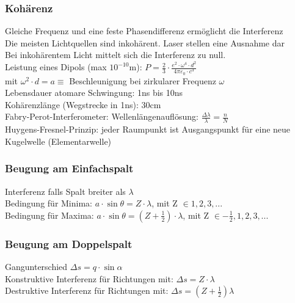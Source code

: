 \documentclass[fs, footer]{latex4ei}
\begin{document}
\begin{multicols*}{4}
\subsubsection{Kohärenz}
Gleiche Frequenz und eine feste Phasendifferenz ermöglicht die Interferenz\\
Die meisten Lichtquellen sind inkohärent. Laser stellen eine Ausnahme dar\\
Bei inkohärentem Licht mittelt sich die Interferenz zu null.\\

Leistung eines Dipols (max $10^{-10}$m): $P = \frac{2}{3}\cdot\frac{e^2\cdot\omega^4\cdot d^2}{4\pi\varepsilon_0\cdot c^3}$\\
 mit $\omega^2\cdot d = a \equiv$ Beschleunigung bei zirkularer Frequenz $\omega$\\ 
Lebensdauer atomare Schwingung: 1ns bis 10ns\\
Kohärenzlänge (Wegstrecke in 1ns): 30cm\\
Fabry-Perot-Interferometer: Wellenlängenauflösung: $\frac{\Delta \lambda}{\lambda} = \frac{n}{N}$\\

Huygens-Fresnel-Prinzip: jeder Raumpunkt ist Ausgangspunkt für eine neue Kugelwelle (Elementarwelle)\\
\subsubsection{Beugung am Einfachspalt}
Interferenz falls Spalt breiter als $\lambda$\\
Bedingung für Minima: $a\!\cdot\!\sin\theta = Z\cdot\lambda$, mit Z $\in 1,2,3,...$\\ %
Bedingung für Maxima: $a\cdot\sin\theta = (Z+\frac{1}{2})\cdot\lambda$, mit Z $\in -\frac{1}{2},1,2,3,...$\\%
\subsubsection{Beugung am Doppelspalt}
Gangunterschied $\Delta s = q\cdot\sin\alpha$\\
Konstruktive Interferenz für Richtungen mit: $\Delta s = Z \cdot \lambda$\\
Destruktive Interferenz für Richtungen mit: $\Delta s = (Z+\frac{1}{2})\lambda$\\

\end{multicols*}
\end{document}
